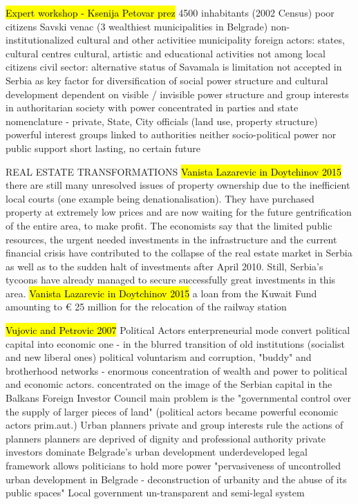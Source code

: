 \documentclass[11pt]{report}
\begin{document}
\hl{Expert workshop - Ksenija Petovar prez}
4500 inhabitants (2002 Census)
poor citizens
Savski venac (3 wealthiest municipalities in Belgrade)
non-institutionalized cultural and other activitiee 
    municipality
    foreign actors: states, cultural centres
    cultural, artistic and educational activities
    not among local citizens
civil sector:
    alternative status of Savamala is limitation
    not accepted in Serbia  as key factor for diversification of social power structure and cultural development
    dependent on visible / invisible power structure and group interests in authoritarian society with power concentrated in parties and state nomenclature - private, State, City officials (land use, property structure)
    powerful interest groups linked to authorities
    neither socio-political power nor public support
    short lasting, no certain future
    
REAL ESTATE TRANSFORMATIONS
\hl{Vanista Lazarevic in Doytchinov 2015}
there are still many unresolved issues of property ownership due to  the  inefficient  local  courts  (one  example  being denationalisation).  They  have purchased property at extremely low prices and are now waiting for the future gentrification of the entire area, to make profit. The economists say that the limited public resources, the urgent needed investments in the infrastructure and  the  current  financial  crisis  have  contributed  to  the  collapse  of  the  real estate market in Serbia as well as to the sudden halt of investments after April 2010. Still, Serbia’s tycoons have already managed to secure successfully great investments in this area.
\hl{Vanista Lazarevic in Doytchinov 2015}
a loan from the Kuwait Fund amounting to € 25 million for the relocation of the railway station

\hl{Vujovic and Petrovic 2007}
	Political Actors
enterpreneurial mode
convert political capital into economic one - in the blurred transition of old institutions (socialist and  new liberal ones)
political voluntarism and corruption, "buddy" and brotherhood networks - enormous concentration of wealth and power to political and economic actors.
concentrated on the image of the Serbian capital in the Balkans
	Foreign Investor Council
main problem is the "governmental control over the supply of larger pieces of land" (political actors became powerful economic actors prim.aut.)
	Urban planners
private and group interests rule the actions of planners
planners are deprived of dignity and professional authority
private investors dominate Belgrade's urban development
underdeveloped legal framework allows politicians to hold more power
"pervasiveness of uncontrolled urban development in Belgrade - deconstruction of urbanity and the abuse of its public spaces"
Local government un-transparent and semi-legal system
    
\end{document}
